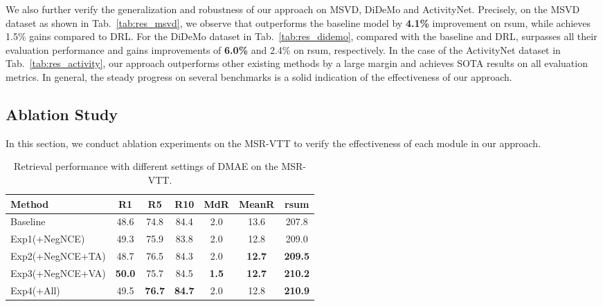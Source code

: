 \documentclass[sigconf]{acmart}
\begin{document}
We also further verify the generalization and robustness of our approach on MSVD, DiDeMo and ActivityNet.
Precisely, on the MSVD dataset as shown in Tab.~\ref{tab:res_msvd}, we observe that  outperforms the baseline model by \textbf{4.1\%} improvement on rsum, while  achieves 1.5\% gains compared to DRL.
For the DiDeMo dataset in Tab.~\ref{tab:res_didemo}, compared with the baseline and DRL,  surpasses all their evaluation performance and gains improvements of \textbf{6.0\%} and 2.4\% on rsum, respectively.
In the case of the ActivityNet dataset in Tab.~\ref{tab:res_activity}, our approach outperforms other existing methods by a large margin and achieves SOTA results on all evaluation metrics.
In general, the steady progress on several benchmarks is a solid indication of the effectiveness of our approach.





\vspace{-0.1cm}
\subsection{Ablation Study}\label{subsec:ablation}
In this section, we conduct ablation experiments on the MSR-VTT to verify the effectiveness of each module in our approach. 
\begin{table}[]
    \centering
    \caption{Retrieval performance with different settings of DMAE on the MSR-VTT.}\label{tab:res_c1}
    \renewcommand{\arraystretch}{0.8}\setlength\tabcolsep{1pt}\begin{tabular}{l| c c c c c c}
        \toprule
        {Method} & {R1} & {R5} & {R10} & {MdR} & {MeanR} & {rsum} \\ \toprule
{Baseline} &48.6 &74.8	&84.4	&2.0 &13.6	&207.8 \\ \midrule
{Exp1(+NegNCE)} & 49.3	& 75.9& 83.8& 2.0	&12.8	& 209.0 \\ 
        {Exp2(+NegNCE+TA)} & 48.7 &76.5 &84.3 &2.0 &\textbf{12.7}	& \textbf{209.5} \\
        {Exp3(+NegNCE+VA)} & \textbf{50.0} &75.7 &84.5 &\textbf{1.5} &\textbf{12.7}	& \textbf{210.2} \\ {Exp4(+All)} &49.5 & \textbf{76.7} & \textbf{84.7} &2.0	&12.8	&\textbf{210.9}  \\ \bottomrule
    \end{tabular}
\end{table}
\end{document}
